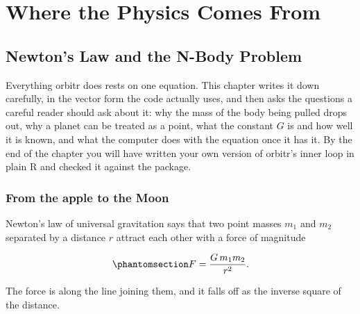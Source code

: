 \documentclass[
  10.5pt,
  letterpaper,
]{scrbook}
\theoremstyle{definition}
\theoremstyle{plain}
\theoremstyle{remark}
\begin{document}
\part{Where the Physics Comes From}

\chapter{Newton's Law and the N-Body Problem}\label{sec-newton}

Everything orbitr does rests on one equation. This chapter writes it
down carefully, in the vector form the code actually uses, and then asks
the questions a careful reader should ask about it: why the mass of the
body being pulled drops out, why a planet can be treated as a point,
what the constant \(G\) is and how well it is known, and what the
computer does with the equation once it has it. By the end of the
chapter you will have written your own version of orbitr's inner loop in
plain R and checked it against the package.

\section{From the apple to the Moon}\label{from-the-apple-to-the-moon}

Newton's law of universal gravitation says that two point masses \(m_1\)
and \(m_2\) separated by a distance \(r\) attract each other with a
force of magnitude

\begin{equation}\protect\phantomsection\label{eq-newton-scalar}{
F = \frac{G\,m_1 m_2}{r^2}.
}\end{equation}

The force is along the line joining them, and it falls off as the
inverse square of the distance.
\end{document}
